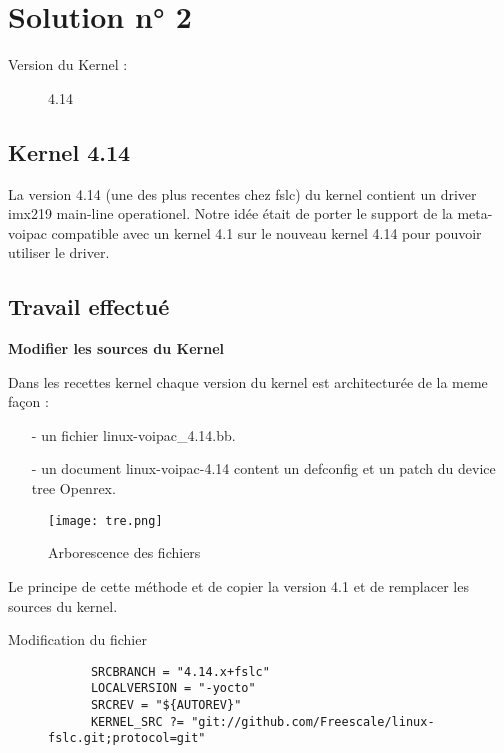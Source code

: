 
\chapter{Solution n° 2} %

\label{Chapter3} %
\begin{description}
  \item[Version du Kernel :] 4.14
\end{description}

\section{Kernel 4.14}
La version 4.14 (une des plus recentes chez fslc) du kernel contient un driver imx219
main-line operationel. Notre idée était de porter le support de la meta-voipac compatible
avec un kernel 4.1 sur le nouveau kernel 4.14 pour pouvoir utiliser le driver.

\section{Travail effectué}
\textbf{Modifier les sources du Kernel}

 Dans les recettes kernel chaque version du kernel est architecturée de la meme façon :
  \begin{itemize}
  \item[-] un fichier linux-voipac\_4.14.bb.
  \item[-] un document linux-voipac-4.14 content un defconfig et un patch du device tree Openrex.
  \end{itemize}

\begin{figure}[th]
  \centering
  \texttt{[image: tre.png]}
  \decoRule
  \caption{Arborescence des fichiers}  \label{fig:arborescence4.14}
\end{figure}

Le principe de cette méthode et de copier la version 4.1 et de remplacer les sources du kernel. 

\begin{description}
  \item[Modification du fichier]
    \begin{lstlisting}
      SRCBRANCH = "4.14.x+fslc"
      LOCALVERSION = "-yocto"
      SRCREV = "${AUTOREV}"
      KERNEL_SRC ?= "git://github.com/Freescale/linux-fslc.git;protocol=git"
    \end{lstlisting}
\end{description}


